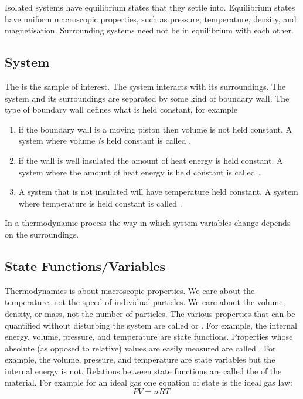 \documentclass[a4paper]{article}
\begin{document}
    Isolated systems have equilibrium states that they settle into.
    Equilibrium states have uniform macroscopic properties, such as pressure, temperature, density, and magnetisation.
    Surrounding systems need not be in equilibrium with each other.
    
    \subsection{System}
    The  is the sample of interest.
    The system interacts with its surroundings.
    The system and its surroundings are separated by some kind of boundary wall.
    The type of boundary wall defines what is held constant, for example
    \begin{enumerate}
        \item if the boundary wall is a moving piston then volume is not held constant.
        A system where volume \emph{is} held constant is called .
        \item if the wall is well insulated the amount of heat energy is held constant.
        A system where the amount of heat energy is held constant is called .
        \item A system that is not insulated will have temperature held constant.
        A system where temperature is held constant is called .
    \end{enumerate}
    In a thermodynamic process the way in which system variables change depends on the surroundings.
    
    \subsection{State Functions/Variables}
    Thermodynamics is about macroscopic properties.
    We care about the temperature, not the speed of individual particles.
    We care about the volume, density, or mass, not the number of particles.
    The various properties that can be quantified without disturbing the system are called  or .
    For example, the internal energy, volume, pressure, and temperature are state functions.
    Properties whose absolute (as opposed to relative) values are easily measured are called .
    For example, the volume, pressure, and temperature are state variables but the internal energy is not.
    Relations between state functions are called the  of the material.
    For example for an ideal gas one equation of state is the ideal gas law:
    \[PV = nRT.\]
    
\end{document}

